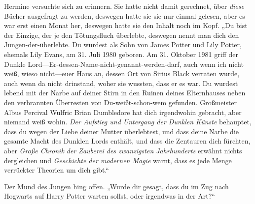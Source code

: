 Hermine versuchte sich zu erinnern. Sie hatte nicht damit gerechnet, über \emph{diese} Bücher ausgefragt zu werden, deswegen hatte sie sie nur einmal gelesen, aber es war erst einen Monat her, deswegen hatte sie den Inhalt noch im Kopf. „Du bist der Einzige, der je den Tötungsfluch überlebte, deswegen nennt man dich den Jungen-der-überlebte. Du wurdest als Sohn von James Potter und Lily Potter, ehemals Lily Evans, am 31. Juli 1980 geboren. Am 31. Oktober 1981 griff der Dunkle Lord—Er-dessen-Name-nicht-genannt-werden-darf, auch wenn ich nicht weiß, wieso nicht—euer Haus an, dessen Ort von Sirius Black verraten wurde, auch wenn da nicht drinstand, woher sie wussten, dass er es war. Du wurdest lebend mit der Narbe auf deiner Stirn in den Ruinen deines Elternhauses neben den verbrannten Überresten von Du-weißt-schon-wem gefunden. Großmeister Albus Percival Wulfric Brian Dumbledore hat dich irgendwohin gebracht, aber niemand weiß wohin. \emph{Der Aufstieg und Untergang der Dunklen Künste} behauptet, dass du wegen der Liebe deiner Mutter überlebtest, und dass deine Narbe die gesamte Macht des Dunklen Lords enthält, und dass die Zentauren dich fürchten, aber \emph{Große Chronik der Zauberei des zwanzigsten Jahrhunderts} erwähnt nichts dergleichen und \emph{Geschichte der modernen Magie} warnt, dass es jede Menge verrückter Theorien um dich gibt.“

Der Mund des Jungen hing offen. „Wurde dir gesagt, dass du im Zug nach Hogwarts auf Harry Potter warten sollst, oder irgendwas in der Art?“

